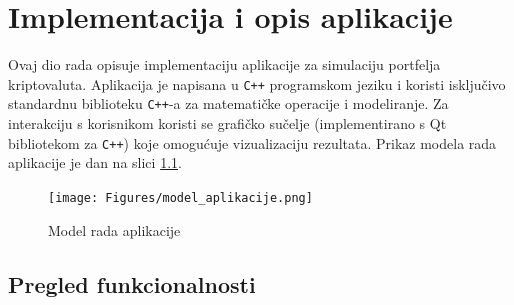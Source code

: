 \documentclass[zavrsnirad, upload]{fer}
\begin{document}
\chapter{Implementacija i opis aplikacije}
\label{pog:implementacija}
Ovaj dio rada opisuje implementaciju aplikacije za simulaciju
portfelja kriptovaluta. Aplikacija je napisana u \texttt{C++} programskom
jeziku i koristi isključivo standardnu biblioteku \texttt{C++}-a za matematičke
operacije i modeliranje. Za interakciju s korisnikom koristi se
grafičko sučelje (implementirano s Qt bibliotekom za \texttt{C++}) koje
omogućuje vizualizaciju rezultata. Prikaz modela rada aplikacije
je dan na slici \ref{fig:model_aplikacije}.
\\

\begin{figure}[H]
    \centering
    \texttt{[image: Figures/model\_aplikacije.png]}
    \caption{Model rada aplikacije}
    \label{fig:model_aplikacije}
\end{figure}

\section{Pregled funkcionalnosti}
\label{sek:pregled_funkcionalnosti}
\end{document}
